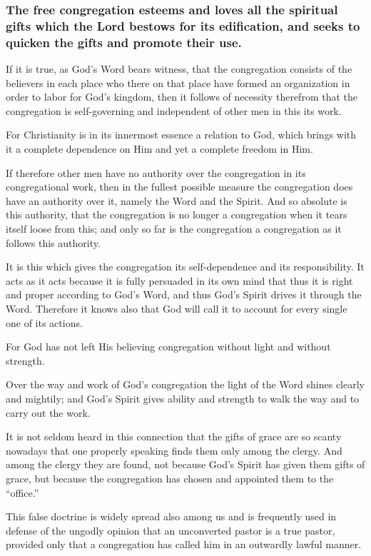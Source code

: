 \subsubsection{The free congregation esteems and loves all the spiritual gifts which the Lord bestows for its edification, and seeks to quicken the gifts and promote their use.}

If it is true, as God’s Word bears witness, that the congregation consists of the believers in each place who there on that place have formed an organization in order to labor for God’s kingdom, then it follows of necessity therefrom that the congregation is self-governing and independent of other men in this its work.

For Christianity is in its innermost essence a relation to God, which brings with it a complete dependence on Him and yet a complete freedom in Him.

If therefore other men have no authority over the congregation in its congregational work, then in the fullest possible measure the congregation does have an authority over it, namely the Word and the Spirit. And so absolute is this authority, that the congregation is no longer a congregation when it tears itself loose from this; and only so far is the congregation a congregation as it follows this authority.

It is this which gives the congregation its self-dependence and its responsibility. It acts as it acts because it is fully persuaded in its own mind that thus it is right and proper according to God’s Word, and thus God’s Spirit drives it through the Word. Therefore it knows also that God will call it to account for every single one of its actions.

For God has not left His believing congregation without light and without strength.

Over the way and work of God’s congregation the light of the Word shines clearly and mightily; and God’s Spirit gives ability and strength to walk the way and to carry out the work.

It is not seldom heard in this connection that the gifts of grace are so scanty nowadays that one properly speaking finds them only among the clergy. And among the clergy they are found, not because God’s Spirit has given them gifts of grace, but because the congregation has chosen and appointed them to the “office.”

This false doctrine is widely spread also among us and is frequently used in defense of the ungodly opinion that an unconverted pastor is a true pastor, provided only that a congregation has called him in an outwardly lawful manner.

